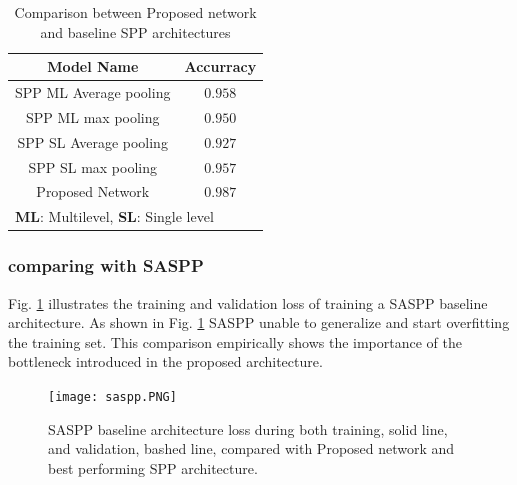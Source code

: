 \begin{table}[htbp]
\caption{Comparison between Proposed network and baseline SPP architectures }
\begin{center}
\begin{tabular}{|c|c|}
\hline
\textbf{Model Name}& Accurracy \\
\hline
 SPP ML Average pooling & $0.958$   \\
\hline
SPP ML max pooling & $0.950$   \\
\hline
  SPP SL Average pooling & $0.927$   \\
\hline
  SPP SL max pooling & $0.957$ \\
\hline
Proposed Network & $0.987$\\
\hline
\multicolumn{2}{l}{ \textbf{ML}: Multilevel, \textbf{SL}: Single level}
\end{tabular}
\label{blaccom}
\end{center}
\end{table}
\subsubsection{comparing with SASPP}
Fig. \ref{saspp} illustrates the training and validation loss of training a SASPP baseline architecture. As shown in Fig. \ref{saspp} SASPP unable to generalize and start overfitting the training set. This comparison empirically shows the importance of the bottleneck introduced in the proposed architecture.

\begin{center}
\begin{figure}[htbp]
\centerline{\texttt{[image: saspp.PNG]}}
\caption{SASPP baseline architecture loss during both training, solid line, and validation, bashed line, compared with Proposed network and best performing SPP architecture.}
\label{saspp}
\end{figure}
\end{center}

